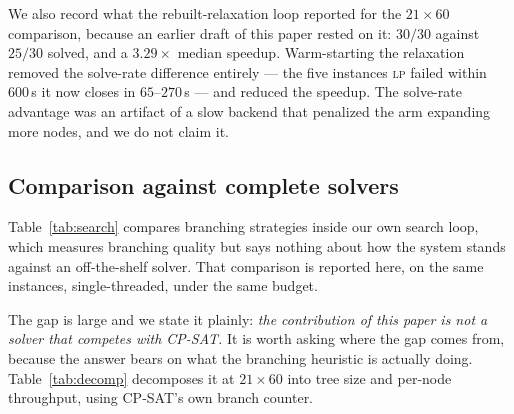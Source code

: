 \documentclass[preprint,12pt]{elsarticle}
\begin{document}
We also record what the rebuilt-relaxation loop reported for the $21\times60$ comparison, because an earlier draft of this paper rested on it: $30/30$ against $25/30$ solved, and a $3.29\times$ median speedup. Warm-starting the relaxation removed the solve-rate difference entirely --- the five instances \textsc{lp} failed within $600$\,s it now closes in $65$--$270$\,s --- and reduced the speedup. The solve-rate advantage was an artifact of a slow backend that penalized the arm expanding more nodes, and we do not claim it.

\subsection{Comparison against complete solvers}
\label{sec:exp-classical}

Table~\ref{tab:search} compares branching strategies inside our own search loop, which measures branching quality but says nothing about how the system stands against an off-the-shelf solver. That comparison is reported here, on the same instances, single-threaded, under the same budget.

\begin{table}[h]
\centering
{}
\caption{Median solve time; all methods solve every instance at every size. The proposed column is the \textsc{model} arm of Table~\ref{tab:search} (mean of per-seed medians); the last row adds the $100$-instance set and the fine-tuned policy of Section~\ref{sec:exp-rl}. The proposed system does not beat a complete solver at any size tested, and is outperformed by SCIP, whose LP code it uses for training features.}
\label{tab:classical}
\end{table}

The gap is large and we state it plainly: \emph{the contribution of this paper is not a solver that competes with CP-SAT.} It is worth asking where the gap comes from, because the answer bears on what the branching heuristic is actually doing. Table~\ref{tab:decomp} decomposes it at $21\times60$ into tree size and per-node throughput, using CP-SAT's own branch counter.
\end{document}
